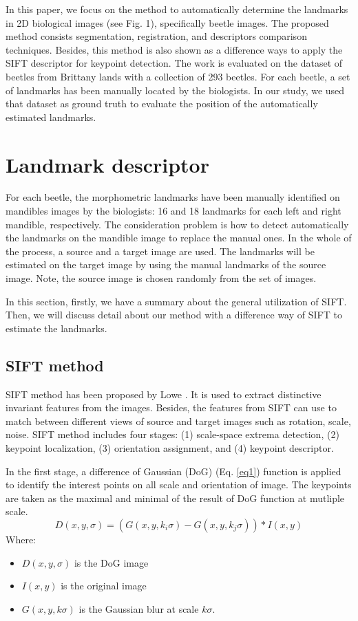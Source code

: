 \documentclass{gretsi}
\begin{document}
In this paper, we focus on the method to automatically determine the landmarks in 2D biological images (see Fig. 1), specifically beetle images. The proposed method consists segmentation, registration, and descriptors comparison techniques. Besides, this method is also shown as a difference ways to apply the SIFT descriptor for keypoint detection. The work is evaluated on the dataset of beetles from Brittany lands with a collection of 293 beetles. For each beetle, a set of landmarks has been manually located by the biologists. In our study, we used that dataset as ground truth to evaluate the position of the automatically estimated landmarks.
\section{Landmark descriptor}
For each beetle, the morphometric landmarks have been manually identified on mandibles images by the biologists: 16 and 18 landmarks for each left and right mandible, respectively. The consideration problem is how to detect automatically the landmarks on the mandible image to replace the manual ones. In the whole of the process, a source and a target image are used. The landmarks will be estimated on the target image by using the manual landmarks of the source image. Note, the source image is chosen randomly from the set of images.

In this section, firstly, we have a summary about the general utilization of SIFT. Then, we will discuss detail about our method with a difference way of SIFT to estimate the landmarks.
\subsection{SIFT method}
\label{secSIFT}
SIFT method has been proposed by Lowe \cite{lowe1999object, lowe2004distinctive}. It is used to extract distinctive invariant features from the images. Besides, the features from SIFT can use to match between different views of source and target images such as rotation, scale, noise. SIFT method includes four stages: (1) scale-space extrema detection, (2) keypoint localization, (3) orientation assignment, and (4) keypoint descriptor.

In the first stage, a difference of Gaussian (DoG) \cite{davidson2006molecular} (Eq. \ref{eq1}) function is applied to identify the interest points on all scale and orientation of image. The keypoints are taken as the maximal and minimal of the result of DoG function at mutliple scale.
\begin{equation}
	D(x,y,\sigma) = (G(x,y,k_i\sigma) - G(x,y,k_j\sigma)) * I(x,y)
	\label{eq1}
\end{equation}
Where:
\begin{itemize}
	\item $D(x,y,\sigma)$ is the DoG image
	\item $I(x,y)$ is the original image
	\item $G(x,y,k\sigma)$ is the Gaussian blur at scale $k\sigma$.
\end{itemize}
\end{document}
